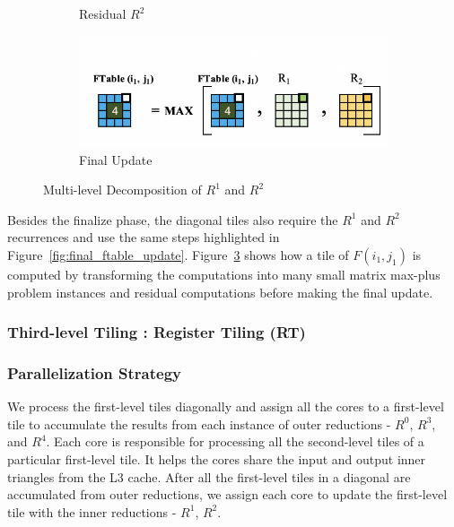 \begin{figure}
\begin{subfigure}[t]{0.22\textwidth}
\caption{Residual $R^{2}$}
\label{fig:mono_R_2}
\end{subfigure}
\vspace{0.5mm}
\begin{subfigure}[t]{0.22\textwidth}
\centering
\includegraphics[width=\textwidth, scale=0.30, trim=4 4 4 4,clip]{content/figures/ftable_final.png}
\caption{Final Update}
\label{fig:mono_final}
\end{subfigure}
\caption{Multi-level Decomposition of $R^{1}$ and $R^{2}$}
\label{fig:R_1_2_matrix_max_plus}
\end{figure}
Besides the finalize phase, the diagonal tiles also require the $R^{1}$ and $R^{2}$ recurrences and use the same steps highlighted in Figure~\ref{fig:final_ftable_update}.
Figure~\ref{fig:R_1_2_matrix_max_plus} shows how a tile of $F(i_{1}, j_{1})$ is computed by transforming the computations into many small matrix max-plus problem instances and residual computations before making the final update.


\subsubsection{Third-level Tiling : Register Tiling (\textbf{RT})}

\subsubsection{Parallelization Strategy} We process the first-level tiles diagonally and assign all the cores to a first-level tile to accumulate the results from each instance of outer reductions - $R^{0}$, $R^{3}$, and $R^{4}$. Each core is responsible for processing all the second-level tiles of a particular first-level tile. It helps the cores share the input and output inner triangles from the L3 cache. After all the first-level tiles in a diagonal are accumulated from outer reductions, we assign each core to update the first-level tile with the inner reductions - $R^{1}$, $R^{2}$. 





